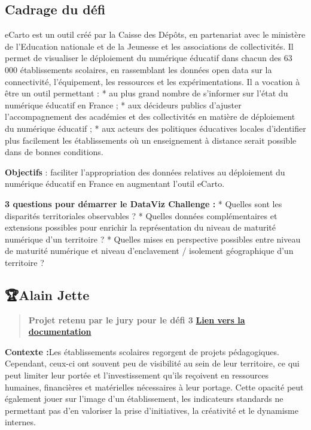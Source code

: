 \documentclass[]{book}
\begin{document}
\subsection{Cadrage du défi}\label{cadrage-du-defi-2}

eCarto est un outil créé par la Caisse des Dépôts, en partenariat avec
le ministère de l'Education nationale et de la Jeunesse et les
associations de collectivités. Il permet de visualiser le déploiement du
numérique éducatif dans chacun des 63 000 établissements scolaires, en
rassemblant les données open data sur la connectivité, l'équipement, les
ressources et les expérimentations. Il a vocation à être un outil
permettant : * au plus grand nombre de s'informer sur l'état du
numérique éducatif en France ; * aux décideurs publics d'ajuster
l'accompagnement des académies et des collectivités en matière de
déploiement du numérique éducatif ; * aux acteurs des politiques
éducatives locales d'identifier plus facilement les établissements où un
enseignement à distance serait possible dans de bonnes conditions.

\textbf{Objectifs} : faciliter l'appropriation des données relatives au
déploiement du numérique éducatif en France en augmentant l'outil
eCarto.

\textbf{3 questions pour démarrer le DataViz Challenge :} * Quelles sont
les disparités territoriales observables ? * Quelles données
complémentaires et extensions possibles pour enrichir la représentation
du niveau de maturité numérique d'un territoire ? * Quelles mises en
perspective possibles entre niveau de maturité numérique et niveau
d'enclavement / isolement géographique d'un territoire ?

\subsection{🏆Alain Jette}\label{alain-jette}

\begin{quote}
\textbf{Projet retenu par le jury pour le défi 3}
\textbf{\href{https://drive.google.com/drive/folders/1dkZBb5xC6zCmAiD-EKUGl0TThzRDolEe}{Lien
vers la documentation}}
\end{quote}

\textbf{Contexte :}Les établissements scolaires regorgent de projets
pédagogiques. Cependant, ceux-ci ont souvent peu de visibilité au sein
de leur territoire, ce qui peut limiter leur portée et l'investissement
qu'ils reçoivent en ressources humaines, financières et matérielles
nécessaires à leur portage. Cette opacité peut également jouer sur
l'image d'un établissement, les indicateurs standards ne permettant pas
d'en valoriser la prise d'initiatives, la créativité et le dynamisme
internes.
\end{document}
